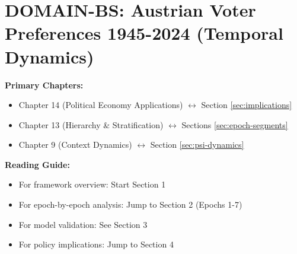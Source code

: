 \section{DOMAIN-BS: Austrian Voter Preferences 1945-2024 (Temporal Dynamics)}
\label{app:domain-austria-voters}

%
%
%
%
%

\begin{tcolorbox}[colback=purple!5!white, colframe=purple!75!black,
    title=Chapter Linkage]

\textbf{Primary Chapters:}
\begin{itemize}[nosep]
\item Chapter 14 (Political Economy Applications) $\leftrightarrow$ Section \ref{sec:implications}
\item Chapter 13 (Hierarchy \& Stratification) $\leftrightarrow$ Sections \ref{sec:epoch-segments}
\item Chapter 9 (Context Dynamics) $\leftrightarrow$ Section \ref{sec:psi-dynamics}
\end{itemize}

\textbf{Reading Guide:}
\begin{itemize}[nosep]
\item For framework overview: Start Section 1
\item For epoch-by-epoch analysis: Jump to Section 2 (Epochs 1-7)
\item For model validation: See Section 3
\item For policy implications: Jump to Section 4
\end{itemize}

\end{tcolorbox}

